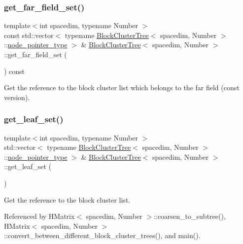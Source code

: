 \subsubsection{\texorpdfstring{get\+\_\+far\+\_\+field\+\_\+set()}{get\_far\_field\_set()}\hspace{0.1cm}{\footnotesize\ttfamily [2/2]}}
{\footnotesize\ttfamily template$<$int spacedim, typename Number $>$ \\
const std\+::vector$<$ typename \hyperlink{classBlockClusterTree}{Block\+Cluster\+Tree}$<$ spacedim, Number $>$\+::\hyperlink{classTreeNode}{node\+\_\+pointer\+\_\+type} $>$ \& \hyperlink{classBlockClusterTree}{Block\+Cluster\+Tree}$<$ spacedim, Number $>$\+::get\+\_\+far\+\_\+field\+\_\+set (\begin{DoxyParamCaption}{ }\end{DoxyParamCaption}) const}

Get the reference to the block cluster list which belongs to the far field (const version). \mbox{\label{classBlockClusterTree_a162b396d814b420f96289425529852e9}} 
\subsubsection{\texorpdfstring{get\+\_\+leaf\+\_\+set()}{get\_leaf\_set()}\hspace{0.1cm}{\footnotesize\ttfamily [1/2]}}
{\footnotesize\ttfamily template$<$int spacedim, typename Number $>$ \\
std\+::vector$<$ typename \hyperlink{classBlockClusterTree}{Block\+Cluster\+Tree}$<$ spacedim, Number $>$\+::\hyperlink{classTreeNode}{node\+\_\+pointer\+\_\+type} $>$ \& \hyperlink{classBlockClusterTree}{Block\+Cluster\+Tree}$<$ spacedim, Number $>$\+::get\+\_\+leaf\+\_\+set (\begin{DoxyParamCaption}{ }\end{DoxyParamCaption})}

Get the reference to the block cluster list. 

Referenced by H\+Matrix$<$ spacedim, Number $>$\+::coarsen\+\_\+to\+\_\+subtree(), H\+Matrix$<$ spacedim, Number $>$\+::convert\+\_\+between\+\_\+different\+\_\+block\+\_\+cluster\+\_\+trees(), and main().

\mbox{\label{classBlockClusterTree_a38c3d1ad3aa983ea1d0b711914664b4c}} 
